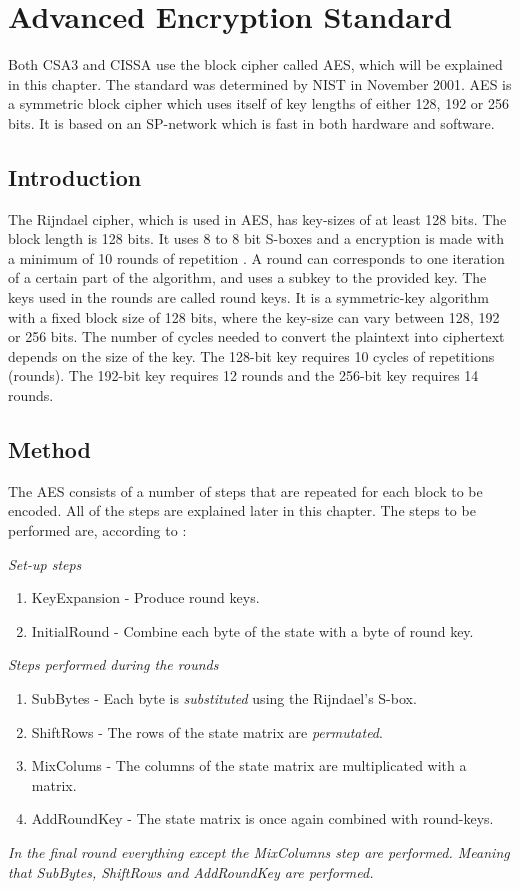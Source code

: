 \chapter{Advanced Encryption Standard}\label{ch:AES}
Both CSA3 and CISSA use the block cipher called AES, which will be 
explained in this chapter. The standard was determined by NIST in 
November 2001. AES is a symmetric block cipher which uses itself of
key lengths of either 128, 192 or 256 bits. It is based on an 
SP-network which is fast in both hardware and software. 

\section{Introduction}
The Rijndael cipher, which is used in AES, has key-sizes of at least 
128 bits. The block length is 128 bits. It uses 8 to 8 bit S-boxes 
and a encryption is made with a minimum of 10 rounds of repetition 
\citep[p. 79]{Stinson:2006}. A round can corresponds to one iteration 
of a certain part of the algorithm, and uses a subkey to the provided 
key. The keys used in the rounds are called round keys. It is a 
symmetric-key algorithm with a fixed block size of 128 bits, where the 
key-size can vary between 128, 192 or 256 bits. The number of cycles 
needed to convert the plaintext into ciphertext depends on the size of 
the key. The 128-bit key requires 10 cycles of repetitions (rounds). 
The 192-bit key requires 12 rounds and the 256-bit key requires 14 
rounds. \citep[p. 103]{Stinson:2006}

\section{Method}
The AES consists of a number of steps that are repeated for each block 
to be encoded. All of the steps are explained later in this chapter.
The steps to be performed are, according to \citet{Stinson:2006}:

\emph{Set-up steps}
\begin{enumerate}
\item KeyExpansion - Produce round keys.
\item InitialRound - Combine each byte of the state with a byte of 
  round key.
\end{enumerate}
\emph{Steps performed during the rounds}
\begin{enumerate}
\item SubBytes - Each byte is \emph{substituted} using the Rijndael's 
  S-box.
\item ShiftRows - The rows of the state matrix are \emph{permutated}.
\item MixColums - The columns of the state matrix are multiplicated with a 
  matrix.
\item AddRoundKey - The state matrix is once again combined with 
  round-keys.
\end{enumerate}
\emph{In the final round everything except the MixColumns step are 
performed. Meaning that SubBytes, ShiftRows and AddRoundKey are 
performed.}

